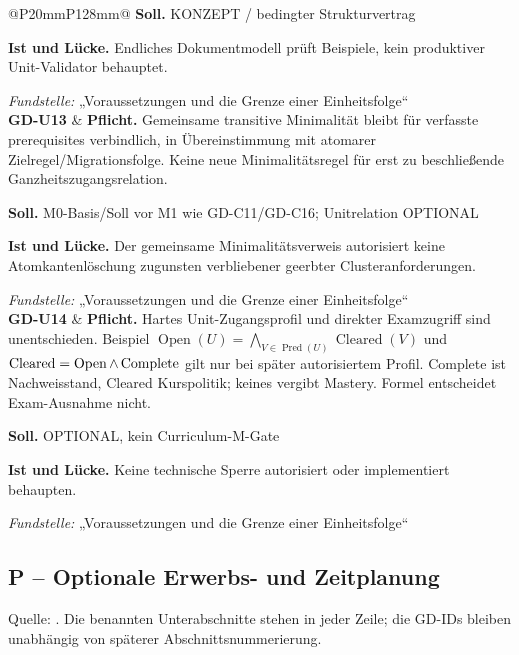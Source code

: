 \begin{longtable}{@{}P{20mm}P{128mm}@{}}
\textbf{Soll.} KONZEPT / bedingter Strukturvertrag\par\smallskip
\textbf{Ist und Lücke.} Endliches Dokumentmodell prüft Beispiele, kein produktiver Unit-Validator behauptet.\par\smallskip
\emph{Fundstelle:} „Voraussetzungen und die Grenze einer Einheitsfolge“\\\addlinespace[5pt]
\label{rule:GD-U13}\textbf{GD-U13} &
\textbf{Pflicht.} Gemeinsame transitive Minimalität bleibt für verfasste prerequisites verbindlich, in Übereinstimmung mit atomarer Zielregel/Migrationsfolge. Keine neue Minimalitätsregel für erst zu beschließende Ganzheitszugangsrelation.\par\smallskip
\textbf{Soll.} M0-Basis/Soll vor M1 wie GD-C11/GD-C16; Unitrelation OPTIONAL\par\smallskip
\textbf{Ist und Lücke.} Der gemeinsame Minimalitätsverweis autorisiert keine Atomkantenlöschung zugunsten verbliebener geerbter Clusteranforderungen.\par\smallskip
\emph{Fundstelle:} „Voraussetzungen und die Grenze einer Einheitsfolge“\\\addlinespace[5pt]
\label{rule:GD-U14}\textbf{GD-U14} &
\textbf{Pflicht.} Hartes Unit-Zugangsprofil und direkter Examzugriff sind unentschieden. Beispiel \(\operatorname{Open}(U)=\bigwedge_{V\in\operatorname{Pred}(U)}\operatorname{Cleared}(V)\) und \(\operatorname{Cleared}=\operatorname{Open}\land\operatorname{Complete}\) gilt nur bei später autorisiertem Profil. Complete ist Nachweisstand, Cleared Kurspolitik; keines vergibt Mastery. Formel entscheidet Exam-Ausnahme nicht.\par\smallskip
\textbf{Soll.} OPTIONAL, kein Curriculum-M-Gate\par\smallskip
\textbf{Ist und Lücke.} Keine technische Sperre autorisiert oder implementiert behaupten.\par\smallskip
\emph{Fundstelle:} „Voraussetzungen und die Grenze einer Einheitsfolge“\\\addlinespace[5pt]
\bottomrule
\end{longtable}
\endgroup

\subsection{P -- Optionale Erwerbs- und Zeitplanung}
Quelle: . Die benannten Unterabschnitte stehen in jeder Zeile; die GD-IDs bleiben unabhängig von späterer Abschnittsnummerierung.


